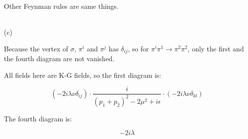 \documentclass[11pt]{article} %
\begin{document}
Other Feynman rules are same things.

~\\
\noindent (c)

Because the vertex of $\sigma$, $\pi^i$ and $\pi^j$ has $\delta_{ij}$, so for $\pi^i \pi^1 \to \pi^2 \pi^2$, only the first and the fourth diagram are not vanished.

All fields here are K-G fields, so the first diagram is:

\[
    (-2 i \lambda \nu \delta_{ij}) \cdot \frac{i}{(p_1 + p_2)^2 - 2 \mu^2 + i \epsilon} \cdot (-2 i \lambda \nu \delta_{kl})   
\]

The fourth diagram is:

\[
    -2 i \lambda    
\]
\end{document}
